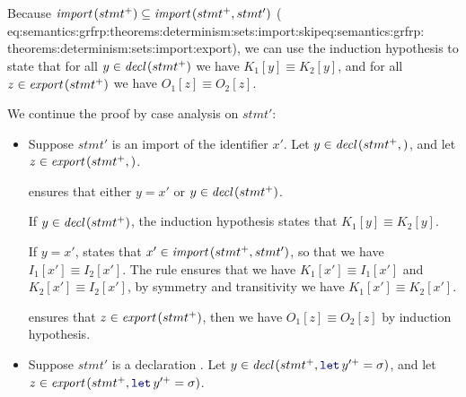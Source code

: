 \begin{skippableproof}
\begin{itemize}
              Because ${\textit{import}\left(stmt^+\right)} \subseteq {\ensuremath{\textit{import}\left(stmt^+, stmt'\right)}}$ (\cf \Crefrange
              {eq:semantics:grfrp:theorems:determinism:sets:import:skip}{eq:semantics:grfrp:%
                  theorems:determinism:sets:import:export}), we can use the induction hypothesis to
              state that for all $y \in {\ensuremath{\textit{decl}\left(stmt^+\right)}}$ we have $K_1[y] \equiv K_2[y]$, and for
              all $z \in {\ensuremath{\textit{export}\left(stmt^+\right)}}$ we have $O_1[z] \equiv O_2[z]$.

              We continue the proof by case analysis on $stmt'$:
              \begin{itemize}
                  \item Suppose $stmt'$ is an import of the identifier $x'$. Let $y \in {\ensuremath{\textit{decl}\left(stmt^+, \right)}}$, and let $z \in{\ensuremath{\textit{export}\left(stmt^+, \right)}}$.

                         ensures that
                        either $y = x'$ or $y \in {\ensuremath{\textit{decl}\left(stmt^+\right)}}$.

                        If $y \in {\ensuremath{\textit{decl}\left(stmt^+\right)}}$, the induction hypothesis states that $K_1[y]
                            \equiv K_2[y]$.

                        If $y = x'$,  states that $x' \in {\ensuremath{\textit{import}\left(stmt^+, stmt'\right)}}$, so that we have
                        $I_1[x'] \equiv I_2[x']$. The rule
                         ensures that we have
                        $K_1[x'] \equiv I_1[x']$ and $K_2[x'] \equiv I_2[x']$, by symmetry and
                        transitivity we have $K_1[x'] \equiv K_2[x']$.

                         ensures that
                        $z \in {\ensuremath{\textit{export}\left(stmt^+\right)}}$, then we have $O_1[z] \equiv O_2[z]$ by induction
                        hypothesis.

                  \item Suppose $stmt'$ is a declaration . Let $y \in
                            \declSet{stmt^+, \decl{y^{\prime +}}{\sigma}}$, and let $z \in
                            \exportSet{stmt^+, \decl{y^{\prime +}}{\sigma}}$.


\end{itemize}
\end{itemize}
\end{skippableproof}
